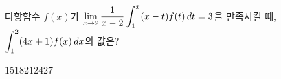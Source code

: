 다항함수 $f(x)$가 $\displaystyle\lim_{x\to 2}\dfrac{1}{x-2}\int_{1}^{x}(x-t)f(t)\mkern3mu dt=3$을 만족시킬 때, $\displaystyle\int_{1}^{2}(4x+1)f(x)\mkern3mu dx$의 값은?
\begin{choices32}{$15$}{$18$}{$21$}{$24$}{$27$}\end{choices32}
